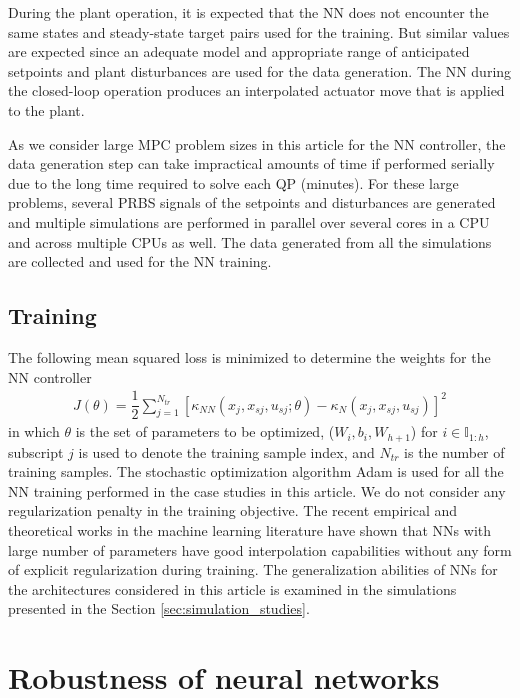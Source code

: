 \documentclass[preprint,5p, twocolumn, authoryear]{elsarticle}
\newcommand{\bbI}{\mathbb{I}}
\begin{document}
During the plant operation, it is expected 
that the NN does not encounter 
the same states and steady-state 
target pairs used for the training. But similar
values are expected since an 
adequate model and appropriate 
range of anticipated 
setpoints and plant disturbances are 
used for the data generation. 
The NN during the closed-loop operation
produces an interpolated actuator
move that is applied to the plant. 

As we consider large
MPC problem sizes in this article for the NN 
controller, the data generation step
can take impractical amounts of time if performed
serially due to the long time required to solve 
each QP (minutes). For these large problems, 
several PRBS signals of the setpoints 
and disturbances are generated and 
multiple simulations are performed in parallel over 
several cores in a CPU and across multiple CPUs as well.
The data generated from all the simulations are collected
and used for the NN training.

\subsection{Training}
The following mean squared loss is minimized 
to determine the weights for the NN controller
\begin{align}
    J (\theta) = \dfrac{1}{2}\sum_{j=1}^{N_{tr}} 
[\kappa_{NN}(x_j, x_{sj}, u_{sj}; \theta) - \kappa_N(x_j, x_{sj}, u_{sj})]^2 
\end{align}
in which $\theta$ is the set of parameters 
to be optimized, ($W_i, b_i, W_{h+1}$)
for $i \in \bbI_{1:h}$, subscript $j$ is used 
to denote the training sample index, and 
$N_{tr}$ is the number of training 
samples. The stochastic optimization algorithm Adam 
\citep*{kingma:ba:2014} is used for all the NN training
performed in the case studies in this article. We do not 
consider any regularization penalty in the training objective. 
The recent empirical and theoretical works in the machine learning 
literature have shown that NNs with large number of parameters 
have good interpolation capabilities 
\citep*{belkin:hsu:ma:mandal:2019, zhang:bengio:hardt:recht:vinyals:2017, 
arora:simon:hu:li:wang:2019, allen-zhu:li:liang:2019} 
without any form of explicit regularization during training.
The generalization abilities of 
NNs for the architectures considered in this article
is examined in the 
simulations presented in the Section \ref{sec:simulation_studies}.

\section{Robustness of neural networks} \label{sec:robustness}
\end{document}
